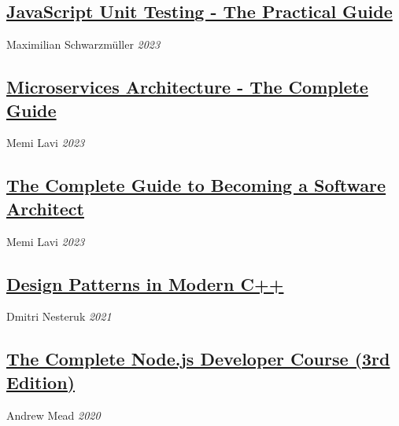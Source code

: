 \subsection{\href{https://www.udemy.com/certificate/UC-693a9313-ded6-4704-a7a2-8bbc476a546e/}{JavaScript Unit Testing - The
Practical Guide}}
Maximilian Schwarzmüller \textit{2023}
\\
\subsection{\href{https://www.udemy.com/certificate/UC-a8db49e4-26b6-4fa6-b156-d1cc5423de7f/}{Microservices Architecture - The Complete Guide}}
Memi Lavi \textit{2023}
\\
\subsection{\href{https://www.udemy.com/certificate/UC-fbe5142e-d448-439a-a4b9-59893a0102ba/}{The Complete Guide to Becoming a Software Architect}}
Memi Lavi \textit{2023}
\\
\subsection{\href{https://www.udemy.com/certificate/UC-df045ecc-7d0c-419c-ab03-3d5ab4a6c8d2/}{Design Patterns in Modern C++}}
Dmitri Nesteruk \textit{2021}
\\
\subsection{\href{https://www.udemy.com/certificate/UC-84c0cc58-82c7-4f03-9bec-ae5e9f681fed/}{The Complete Node.js Developer Course (3rd Edition)}}
Andrew Mead \textit{2020}
\\
%
